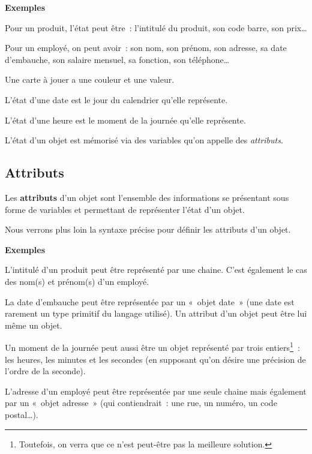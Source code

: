 		\textbf{Exemples}	
		\begin{liste}
		\item 
			Pour un produit, l'état peut être~:
			l'intitulé du produit, son code barre, son prix\dots 
		\item 
			Pour un employé, on peut avoir~: son nom, son prénom, son adresse, sa
			date d'embauche, son salaire mensuel, sa fonction, son
			téléphone\dots
		\item 
			Une carte à jouer a une couleur et une valeur.
		\item 
			L'état d'une date est le jour du
			calendrier qu'elle représente.
		\item 
			L'état d'une heure est le moment de la
			journée qu'elle représente.
		\end{liste}

		L'état d'un objet est mémorisé via des
		variables qu'on appelle des \textit{attributs}.

	\subsection{Attributs}

		Les \textbf{attributs} d'un objet sont
		l'ensemble des informations se présentant sous forme
		de variables et permettant de représenter l'état
		d'un objet.

		Nous verrons plus loin la syntaxe précise 
		pour définir les attributs d'un objet.

		\textbf{Exemples}
		\begin{liste}
		\item 
			L'intitulé d'un produit peut être
			représenté par une chaine. C'est également le cas des
			nom(s) et prénom(s) d'un employé.
		\item 
			La date d'embauche peut être représentée par un «~objet
			date~» (une date est rarement un type primitif du langage utilisé). Un
			attribut d'un objet peut être lui même un objet.
		\item 
			Un moment de la journée peut aussi être un objet représenté par trois
			entiers\footnote{Toutefois, on verra que ce n'est
			peut-être pas la meilleure solution.}~: les heures, les minutes et les
			secondes (en supposant qu'on désire une précision de
			l'ordre de la seconde).
		\item 
			L'adresse d'un employé peut être
			représentée par une seule chaine mais également par un «~objet
			adresse~» (qui contiendrait~: une rue, un numéro, un code postal\dots).
		\end{liste}

